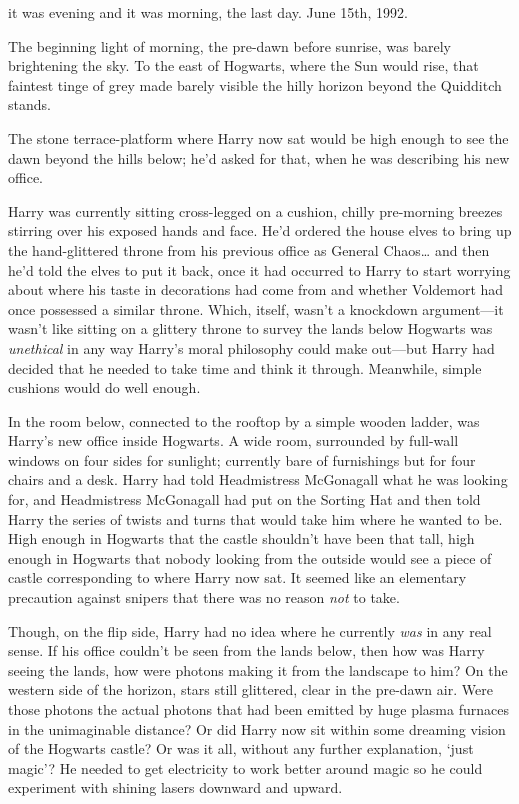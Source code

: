 
 it was evening and it was morning, the last day. June 15th, 1992.

\hplettrineextrapara
The beginning light of morning, the pre-dawn before sunrise, was barely brightening the sky. To the east of Hogwarts, where the Sun would rise, that faintest tinge of grey made barely visible the hilly horizon beyond the Quidditch stands.

The stone terrace-platform where Harry now sat would be high enough to see the dawn beyond the hills below; he'd asked for that, when he was describing his new office.

Harry was currently sitting cross-legged on a cushion, chilly pre-morning breezes stirring over his exposed hands and face. He'd ordered the house elves to bring up the hand-glittered throne from his previous office as General Chaos{\ldots} and then he'd told the elves to put it back, once it had occurred to Harry to start worrying about where his taste in decorations had come from and whether Voldemort had once possessed a similar throne. Which, itself, wasn't a knockdown argument—it wasn't like sitting on a glittery throne to survey the lands below Hogwarts was \emph{unethical} in any way Harry's moral philosophy could make out—but Harry had decided that he needed to take time and think it through. Meanwhile, simple cushions would do well enough.

In the room below, connected to the rooftop by a simple wooden ladder, was Harry's new office inside Hogwarts. A wide room, surrounded by full-wall windows on four sides for sunlight; currently bare of furnishings but for four chairs and a desk. Harry had told Headmistress McGonagall what he was looking for, and Headmistress McGonagall had put on the Sorting Hat and then told Harry the series of twists and turns that would take him where he wanted to be. High enough in Hogwarts that the castle shouldn't have been that tall, high enough in Hogwarts that nobody looking from the outside would see a piece of castle corresponding to where Harry now sat. It seemed like an elementary precaution against snipers that there was no reason \emph{not} to take.

Though, on the flip side, Harry had no idea where he currently \emph{was} in any real sense. If his office couldn't be seen from the lands below, then how was Harry seeing the lands, how were photons making it from the landscape to him? On the western side of the horizon, stars still glittered, clear in the pre-dawn air. Were those photons the actual photons that had been emitted by huge plasma furnaces in the unimaginable distance? Or did Harry now sit within some dreaming vision of the Hogwarts castle? Or was it all, without any further explanation, `just magic'? He needed to get electricity to work better around magic so he could experiment with shining lasers downward and upward.

